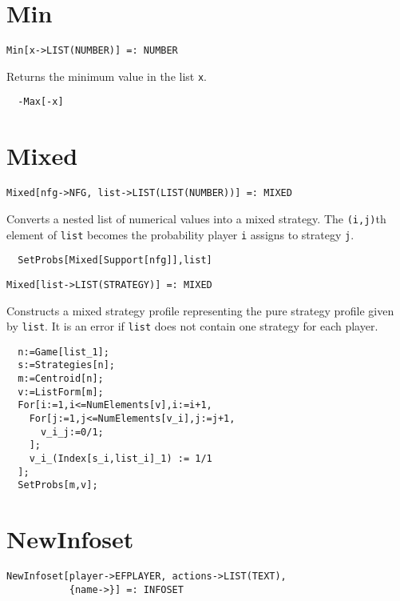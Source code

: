 
\section*{Min}\label{ExtMin}
\begin{verbatim}
Min[x->LIST(NUMBER)] =: NUMBER 
\end{verbatim}

\noindent
Returns the minimum value in the list \verb+x+.  

\udfbody
\begin{verbatim}
  -Max[-x]
\end{verbatim} 


\section*{Mixed}\label{ExtMixed}
\begin{verbatim}
Mixed[nfg->NFG, list->LIST(LIST(NUMBER))] =: MIXED 
\end{verbatim}

\noindent
Converts a nested list of numerical values into a mixed strategy.  The
\verb+(i,j)+th element of \verb+list+ becomes the probability
player \verb+i+ assigns to strategy \verb+j+. 

\udfbody
\begin{verbatim}
  SetProbs[Mixed[Support[nfg]],list]
\end{verbatim} 

\newsignature

\begin{verbatim}
Mixed[list->LIST(STRATEGY)] =: MIXED 
\end{verbatim}

\noindent
Constructs a mixed strategy profile representing the pure strategy
profile given by \verb+list+. It is an error if \verb+list+ does not
contain one strategy for each player.

\udfbody
\begin{verbatim}
  n:=Game[list_1];
  s:=Strategies[n];
  m:=Centroid[n];
  v:=ListForm[m];
  For[i:=1,i<=NumElements[v],i:=i+1,
    For[j:=1,j<=NumElements[v_i],j:=j+1,
      v_i_j:=0/1;
    ];
    v_i_(Index[s_i,list_i]_1) := 1/1
  ];
  SetProbs[m,v];   
\end{verbatim} 



\section*{NewInfoset}\label{ExtNewInfoset}
\begin{verbatim}
NewInfoset[player->EFPLAYER, actions->LIST(TEXT), 
           {name->}] =: INFOSET 
\end{verbatim}

